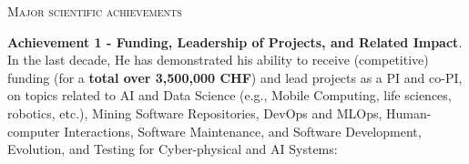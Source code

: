\documentclass[11pt]{article}
\begin{document}
\vspace{2.5mm}


\textsc{\fontsize{14}{12}\selectfont Major scientific achievements}


\noindent \textbf{Achievement 1 - Funding, Leadership of Projects, and Related Impact}. 
In the last decade, He has demonstrated his ability to receive (competitive) funding (for a \textbf{total over 3,500,000 CHF}) and lead projects as a PI
and co-PI, on topics related to AI and Data Science (e.g., Mobile Computing, life sciences, robotics, etc.), Mining Software
Repositories, DevOps and MLOps, Human-computer Interactions, Software Maintenance, and
Software Development, Evolution, and Testing for Cyber-physical and AI Systems:

\vspace{-3.5mm}
\begin{itemize}


\end{itemize}
\end{document}
